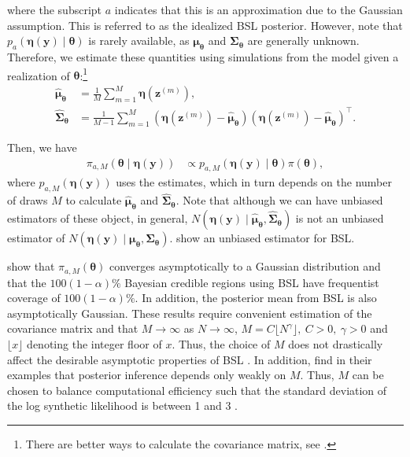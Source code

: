 where the subscript \( a \) indicates that this is an approximation due to the Gaussian assumption. This is referred to as the idealized BSL posterior. However, note that \( p_a(\boldsymbol{\eta}(\boldsymbol{y})\mid \boldsymbol{\theta}) \) is rarely available, as \( \boldsymbol{\mu}_{\boldsymbol{\theta}} \) and \( \boldsymbol{\Sigma}_{\boldsymbol{\theta}} \) are generally unknown. Therefore, we estimate these quantities using simulations from the model given a realization of $\boldsymbol{\theta}$:\footnote{There are better ways to calculate the covariance matrix, see \cite{nott2023bayesian}.}
\begin{align*} 
	\widehat{\boldsymbol{\mu}}_{\boldsymbol{\theta}} &= \frac{1}{M} \sum_{m=1}^{M} \boldsymbol{\eta}(\boldsymbol{z}^{(m)}),\\
	\widehat{\boldsymbol{\Sigma}}_{\boldsymbol{\theta}} &= \frac{1}{M-1} \sum_{m=1}^{M} (\boldsymbol{\eta}(\boldsymbol{z}^{(m)}) - \widehat{\boldsymbol{\mu}}_{\boldsymbol{\theta}})(\boldsymbol{\eta}(\boldsymbol{z}^{(m)}) - \widehat{\boldsymbol{\mu}}_{\boldsymbol{\theta}})^{\top}. 
\end{align*}

Then, we have 
\begin{align*} 
	\pi_{a,M}(\boldsymbol{\theta} \mid \boldsymbol{\eta}(\boldsymbol{y})) &\propto p_{a,M}(\boldsymbol{\eta}(\boldsymbol{y})\mid \boldsymbol{\theta}) \pi(\boldsymbol{\theta}), 
\end{align*}
where $p_{a,M}(\boldsymbol{\eta}(\boldsymbol{y}))$ uses the estimates, which in turn depends on the number of draws $M$ to calculate $\widehat{\boldsymbol{\mu}}_{\boldsymbol{\theta}}$ and $\widehat{\boldsymbol{\Sigma}}_{\boldsymbol{\theta}}$. Note that although we can have unbiased estimators of these object, in general, $N(\boldsymbol{\eta}(\boldsymbol{y})\mid \widehat{\boldsymbol{\mu}}_{\boldsymbol{\theta}},\widehat{\boldsymbol{\Sigma}}_{\boldsymbol{\theta}})$ is not an unbiased estimator of $N(\boldsymbol{\eta}(\boldsymbol{y})\mid {\boldsymbol{\mu}}_{\boldsymbol{\theta}},{\boldsymbol{\Sigma}}_{\boldsymbol{\theta}})$. \cite{an2022bsl} show an unbiased estimator for BSL. 

\cite{nott2023bayesian} show that \( \pi_{a,M}(\boldsymbol{\theta}) \) converges asymptotically to a Gaussian distribution and that the \( 100(1-\alpha)\% \) Bayesian credible regions using BSL have frequentist coverage of \( 100(1-\alpha)\% \). In addition, the posterior mean from BSL is also asymptotically Gaussian. These results require convenient estimation of the covariance matrix and that \( M \to \infty \) as \( N \to \infty \), $M=C\lfloor N^{\gamma} \rfloor, \ C>0, \ \gamma > 0$ and $\lfloor x \rfloor$ denoting the integer floor of $x$. Thus, the choice of \( M \) does not drastically affect the desirable asymptotic properties of BSL \cite{nott2023bayesian}. In addition, \cite{price2018bayesian} find in their examples that posterior inference depends only weakly on \( M \). Thus, \( M \) can be chosen to balance computational efficiency such that the standard deviation of the log synthetic likelihood is between 1 and 3 \cite{an2019accelerating}. 

